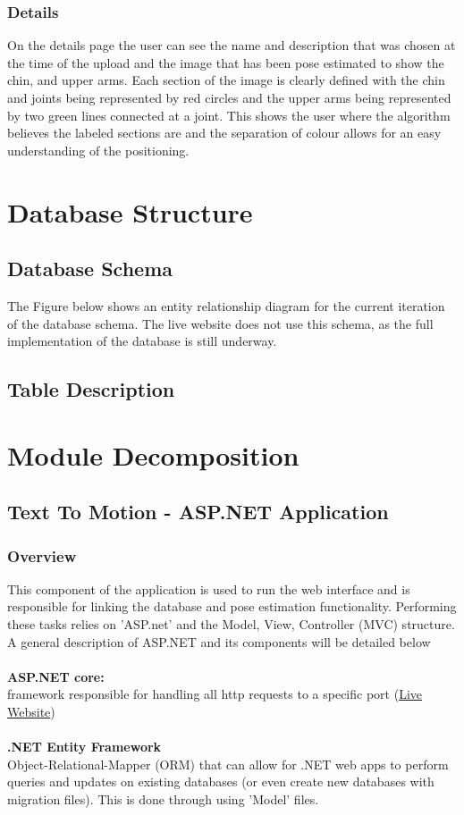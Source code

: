 \documentclass{scrreprt}
\begin{document}
\subsection{Details}
On the details page the user can see the name and description that was chosen at the time of the upload and the image that has been pose estimated to show the chin, and upper arms. Each section of the image is clearly defined with the chin and joints being represented by red circles and the upper arms being represented by two green lines connected at a joint. This shows the user where the algorithm believes the labeled sections are and the separation of colour allows for an easy understanding of the positioning.

\chapter{Database Structure}

\section{Database Schema}
The Figure below shows an entity relationship diagram for the current iteration of the database schema. The live website does not use this schema, as the full implementation of the database is still underway.




\section{Table Description}

\chapter{Module Decomposition}

\section{Text To Motion - ASP.NET Application}


\subsection{Overview}
This component of the application is used to run the web interface and is responsible for linking the database and pose estimation functionality. Performing these tasks relies on 'ASP.net' and the Model, View, Controller (MVC) structure. A general description of ASP.NET and its components will be detailed below
\\\\
\textbf{ASP.NET core:}
\\
framework responsible for handling all http requests to a specific port (\href{159.203.10.112}{Live Website})
\\\\
\textbf{.NET Entity Framework}
\\Object-Relational-Mapper (ORM) that can allow for .NET web apps to perform queries and updates on existing databases (or even create new databases with migration files). This is done through using 'Model' files.
\end{document}
